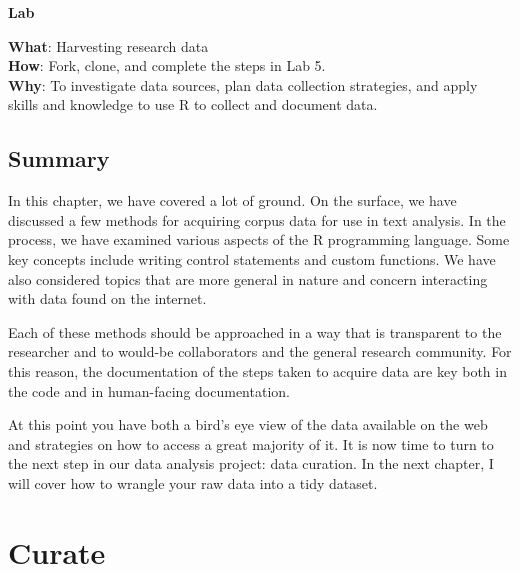 \documentclass[
  letterpaper,
  krantz1]{latex/krantz-mod}
\newcommand{\setDOI}[1]{%
  \gdef\doi{%
    \footnotesize%
    #1\par%
    This chapter has been made available under a CC-BY-NC-ND license.%
  }%
}
\theoremstyle{definition}
\theoremstyle{definition}
\theoremstyle{remark}
\begin{document}
\begin{tcolorbox}[enhanced jigsaw, toprule=.15mm, breakable, colback=white, arc=.35mm, left=2mm, colframe=quarto-callout-color-frame, opacityback=0, bottomrule=.15mm, rightrule=.15mm, leftrule=.75mm]

\textbf{ Lab}

\textbf{What}: Harvesting research data\\
\textbf{How}: Fork, clone, and complete the steps in Lab 5.\\
\textbf{Why}: To investigate data sources, plan data collection
strategies, and apply skills and knowledge to use R to collect and
document data.

\end{tcolorbox}

\section*{Summary}\label{summary-4}


In this chapter, we have covered a lot of ground. On the surface, we
have discussed a few methods for acquiring corpus data for use in text
analysis. In the process, we have examined various aspects of the R
programming language. Some key concepts include writing control
statements and custom functions. We have also considered topics that are
more general in nature and concern interacting with data found on the
internet.

Each of these methods should be approached in a way that is transparent
to the researcher and to would-be collaborators and the general research
community. For this reason, the documentation of the steps taken to
acquire data are key both in the code and in human-facing documentation.

At this point you have both a bird's eye view of the data available on
the web and strategies on how to access a great majority of it. It is
now time to turn to the next step in our data analysis project: data
curation. In the next chapter, I will cover how to wrangle your raw data
into a tidy dataset.

\chapter{Curate}\label{sec-curate-chapter}

\setDOI{10.4324/9781003393764.6}
\thispagestyle{chapterfirstpage}
\end{document}
